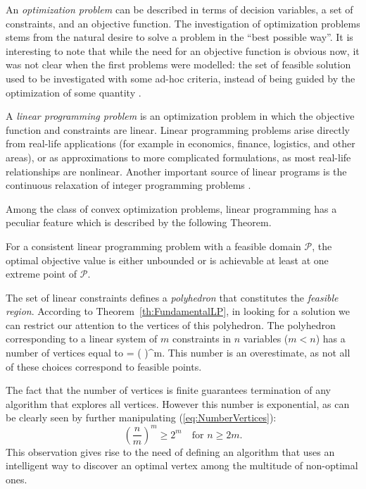 An {\em optimization problem} can be described in terms of decision variables, 
a set of constraints, and an objective function. 
The investigation of optimization problems stems from the natural
desire to solve a problem in the ``best possible way''.
It is interesting to note that while the need for an objective function 
is obvious now, it was not clear when the first problems were modelled: the 
set of feasible solution used to be investigated with some ad-hoc criteria, 
instead of being guided by the optimization of some quantity 
\cite{Dantzig02}.

A {\em linear programming problem} is an optimization problem in which
the objective function and constraints are linear. 
Linear programming problems arise directly from real-life applications
(for example in economics, finance, logistics,
and other areas), or as approximations to
more complicated formulations, as most real-life relationships are
nonlinear. Another important source of linear programs is the 
continuous relaxation of integer programming problems \cite{Schrijver86}.

Among the class of convex optimization problems, linear programming
has a peculiar feature which is described by the following Theorem.

\begin{theorem}
\label{th:FundamentalLP}
For a consistent linear programming problem with a
feasible domain $\mathcal{P}$, the optimal objective value is either
unbounded or is achievable at least at one extreme point of $\mathcal{P}$.
\end{theorem}

The set of linear constraints defines a {\em polyhedron} that constitutes
the {\em feasible region}.
According to Theorem~\ref{th:FundamentalLP}, in looking for a solution 
we can restrict our attention to the vertices of this polyhedron.
The polyhedron corresponding to a linear system of $m$ constraints 
in $n$ variables ($m < n$) has a number of vertices equal to
\be \label{eq:NumberVertices}
 =  \ge \left(  \right)^m.
\ee
This number is an overestimate, as not all of these choices correspond
to feasible points.

The fact that the number of vertices is finite guarantees termination 
of any algorithm that explores all vertices.
However this number is exponential, as can be clearly seen by further
manipulating (\ref{eq:NumberVertices}):
\[
\left( \frac{n}{m} \right)^m \ge 2^m 
\quad \mbox{for } n \ge 2m.
\]
This observation gives rise to the need of defining an algorithm
that uses an intelligent way to discover an optimal vertex 
among the multitude of non-optimal ones.

